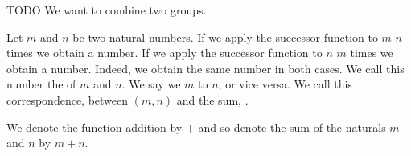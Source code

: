 
\sbasic










\sstart
{}


TODO
We want to combine two groups.


Let $m$ and $n$ be two natural numbers.
If we apply the successor function to $m$ $n$
times we obtain a number.
If we apply the successor function to $n$ $m$
times we obtain a number.
Indeed, we obtain the same number in both cases.
We call this number the 
of $m$ and $n$.
We say we  $m$ to $n$,
or vice versa.
We call this correspondence, between
$(m, n)$ and the sum, .


We denote the function addition by $+$
and so denote the sum of the naturals
$m$ and $n$ by $m + n$.
\strats
